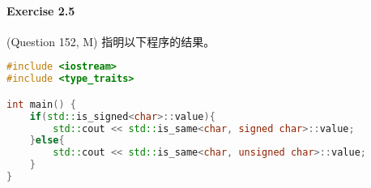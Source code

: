 \documentclass{article}
\begin{document}
	\paragraph*{Exercise 2.5} 
	
	(Question 152, M) 指明以下程序的结果。
	
	\begin{lstlisting}[language=C++]  		
#include <iostream>
#include <type_traits>

int main() {
	if(std::is_signed<char>::value){
		std::cout << std::is_same<char, signed char>::value;
	}else{
		std::cout << std::is_same<char, unsigned char>::value;
	}
}
	\end{lstlisting}
	
\end{document}

